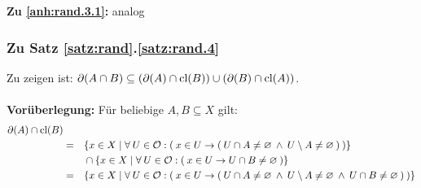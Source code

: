     \noindent
    \textbf{Zu \ref{anh:rand.3.1}: } analog

\subsubsection{Zu Satz \ref{satz:rand}.\ref{satz:rand.4}}\label{anh:rand.4}
    Zu zeigen ist: $\partial(A \cap B) \subseteq (\partial(A) \cap \text{cl}(B)) \cup (\partial(B) \cap \text{cl}(A))$.\\ \ \\

    \noindent
    \textbf{Vorüberlegung: } Für beliebige $A, B \subseteq X$ gilt:
        \begin{align*}
            \partial(A) \cap \text{cl}(B) &&& \\ 
            &=&& \{x \in X \mid \forall\: U \in \mathcal{O}: (\: x \in U \to (\: U \cap A \neq \varnothing \:\land\: U \setminus A \neq \varnothing \:) \:)\}\\
            &&&\cap \{x \in X \mid \forall\: U \in \mathcal{O}: (\: x \in U \to U \cap B \neq \varnothing \:)\}\\
            &=&& \{x \in X \mid \forall\: U \in \mathcal{O}: (\: x \in U \to (\: U \cap A \neq \varnothing \:\land\: U \setminus A \neq \varnothing \:\land\: U \cap B \neq \varnothing \:) \:)\}
        \end{align*}

